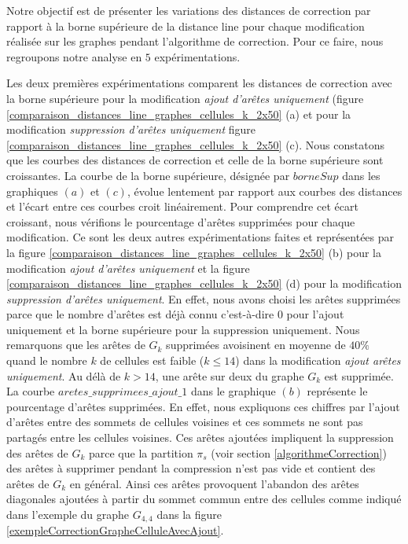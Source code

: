 Notre objectif est de pr\'esenter les variations des distances de correction par rapport \`a la borne sup\'erieure de la distance line pour chaque modification r\'ealis\'ee sur les graphes pendant l'algorithme de correction. Pour ce faire, nous regroupons notre analyse en $5$ exp\'erimentations.
\newline

Les deux premi\`eres exp\'erimentations comparent les distances de correction avec la borne sup\'erieure pour la modification {\em ajout d'ar\^etes uniquement} (figure \ref{comparaison_distances_line_graphes_cellules_k_2x50} (a) et 
pour la modification {\em suppression d'ar\^etes uniquement} figure \ref{comparaison_distances_line_graphes_cellules_k_2x50} (c).
Nous constatons que les courbes des distances de correction et celle de la borne sup\'erieure sont croissantes. 
La courbe de la borne sup\'erieure, d\'esign\'ee par $borneSup$ dans les graphiques $(a)$ et $(c)$, \'evolue lentement par rapport aux courbes des distances et l'\'ecart entre ces courbes croit lin\'eairement. 
Pour comprendre cet \'ecart croissant, nous v\'erifions le pourcentage d'ar\^etes  supprim\'ees pour chaque modification.  Ce sont les deux autres exp\'erimentations faites et repr\'esent\'ees par la figure 
\ref{comparaison_distances_line_graphes_cellules_k_2x50} (b) pour la modification {\em ajout d'ar\^etes uniquement} et
 la figure \ref{comparaison_distances_line_graphes_cellules_k_2x50} (d) pour la modification 
{\em suppression d'ar\^etes uniquement}. 
En effet, nous avons choisi les ar\^etes supprim\'ees parce que le nombre d'ar\^etes est d\'ej\`a connu c'est-\`a-dire $0$ pour l'ajout uniquement et la borne sup\'erieure pour la suppression uniquement. 
\newline
Nous remarquons que les ar\^etes   de $G_k$ supprim\'ees avoisinent en moyenne de
$40\%$ quand le nombre $k$ de cellules est faible ($k \le 14$) dans la modification {\em ajout ar\^etes uniquement}. Au d\'el\`a de $ k > 14 $, une ar\^ete sur deux du graphe $G_{k}$ est supprim\'ee. La courbe  $aretes\_supprimees\_ajout\_1$ dans le graphique $(b)$ repr\'esente le pourcentage d'ar\^etes supprim\'ees.  
En effet, nous expliquons ces chiffres  par l'ajout d'ar\^etes entre des sommets de cellules voisines et ces sommets ne sont pas partag\'es entre les cellules voisines. Ces ar\^etes ajout\'ees impliquent la suppression des ar\^etes de $G_k$ parce que la partition $\pi_s$ (voir section \ref{algorithmeCorrection}) des ar\^etes \`a supprimer pendant la compression n'est pas vide et contient des ar\^etes de $G_k$ en g\'en\'eral. Ainsi ces ar\^etes provoquent l'abandon des ar\^etes diagonales  ajout\'ees \`a partir du sommet commun entre des cellules comme indiqu\'e dans l'exemple du graphe $G_{4,4}$ dans la figure \ref{exempleCorrectionGrapheCelluleAvecAjout}.
